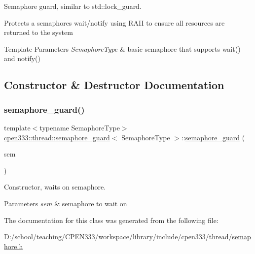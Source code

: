 Semaphore guard, similar to std\+::lock\+\_\+guard. 

Protects a semaphore\textquotesingle{}s wait/notify using R\+A\+II to ensure all resources are returned to the system 
\begin{DoxyTemplParams}{Template Parameters}
{\em Semaphore\+Type} & basic semaphore that supports wait() and notify() \\
\hline
\end{DoxyTemplParams}


\subsection{Constructor \& Destructor Documentation}
\mbox{\label{classcpen333_1_1thread_1_1semaphore__guard_a0704e609f573247313eb66722b6ff145}} 
\subsubsection{\texorpdfstring{semaphore\+\_\+guard()}{semaphore\_guard()}}
{\footnotesize\ttfamily template$<$typename Semaphore\+Type$>$ \\
\hyperlink{classcpen333_1_1thread_1_1semaphore__guard}{cpen333\+::thread\+::semaphore\+\_\+guard}$<$ Semaphore\+Type $>$\+::\hyperlink{classcpen333_1_1thread_1_1semaphore__guard}{semaphore\+\_\+guard} (\begin{DoxyParamCaption}\item[{Semaphore\+Type \&}]{sem }\end{DoxyParamCaption})\hspace{0.3cm}{\ttfamily [inline]}}



Constructor, waits on semaphore. 


\begin{DoxyParams}{Parameters}
{\em sem} & semaphore to wait on \\
\hline
\end{DoxyParams}


The documentation for this class was generated from the following file\+:\begin{DoxyCompactItemize}
\item 
D\+:/school/teaching/\+C\+P\+E\+N333/workspace/library/include/cpen333/thread/\hyperlink{thread_2semaphore_8h}{semaphore.\+h}\end{DoxyCompactItemize}
